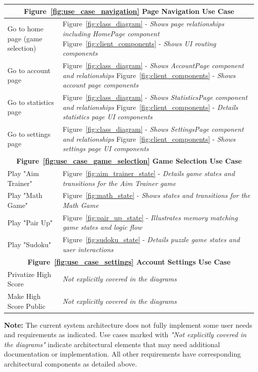 \documentclass[11pt,a4paper]{article}
\begin{document}
\begin{table}
\begin{tabular}{|p{}|p{}|}
\hline
\multicolumn{2}{|c|}{\textbf {Figure~\ref{fig:use_case_navigation} Page Navigation Use Case} }                          \\
\hline
Go to home page (game selection)& Figure~\ref{fig:class_diagram} - \textit{Shows page relationships including HomePage component}\newline
Figure~\ref{fig:client_components} - \textit{Shows UI routing components}\\
\hline
Go to account page& Figure~\ref{fig:class_diagram} - \textit{Shows AccountPage component and relationships}\newline
Figure~\ref{fig:client_components} - \textit{Shows account page components}\\
\hline
Go to statistics page& Figure~\ref{fig:class_diagram} - \textit{Shows StatisticsPage component and relationships}\newline
Figure~\ref{fig:client_components} - \textit{Details statistics page UI components}\\
\hline
Go to settings page& Figure~\ref{fig:class_diagram} - \textit{Shows SettingsPage component and relationships}\newline
Figure~\ref{fig:client_components} - \textit{Shows settings page UI components}\\
\hline
\multicolumn{2}{|c|}{\textbf {Figure~\ref{fig:use_case_game_selection} Game Selection Use Case} }           \\
\hline
Play "Aim Trainer"& Figure~\ref{fig:aim_trainer_state} - \textit{Details game states and transitions for the Aim Trainer game}\\
\hline
Play "Math Game"& Figure~\ref{fig:math_state} - \textit{Shows states and transitions for the Math Game}\\
\hline
Play "Pair Up"& Figure~\ref{fig:pair_up_state} - \textit{Illustrates memory matching game states and logic flow}\\
\hline
Play "Sudoku"& Figure~\ref{fig:sudoku_state} - \textit{Details puzzle game states and user interactions}\\
\hline
\multicolumn{2}{|c|}{\textbf {Figure~\ref{fig:use_case_settings} Account Settings Use Case} }   \\
\hline
Privatize High Score& \textit{Not explicitly covered in the diagrams}\\
\hline
Make High Score Public& \textit{Not explicitly covered in the diagrams}\\
\hline
\end{tabular}

\vspace{8pt} %

\textbf{Note:} The current system architecture does not fully implement some user needs and requirements as indicated. Use cases marked with \textit{"Not explicitly covered in the diagrams"} indicate architectural elements that may need additional documentation or implementation. All other requirements have corresponding architectural components as detailed above.
\end{table}





\end{document}
